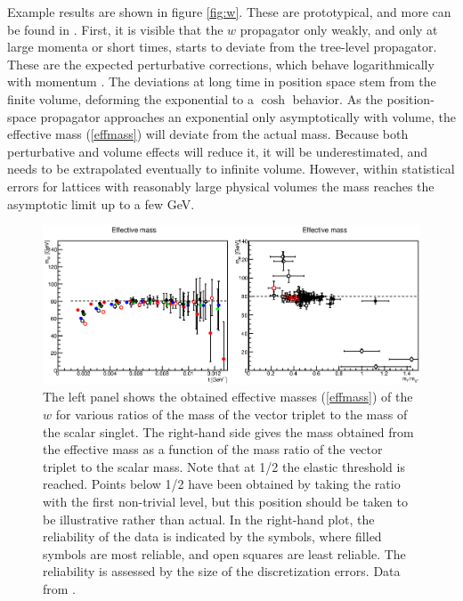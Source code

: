 \documentclass[final,12pt]{article}
\newcommand*{\pref}[1]{(\ref{#1})}
\newcommand*{\1}{1\!\!\!\bot}
\begin{document}
Example results are shown in figure \ref{fig:w}. These are prototypical, and more can be found in  \cite{Maas:2013aia,Maas:unpublished,Maas:2012tj,Maas:2010nc}. First, it is visible that the $w$ propagator only weakly, and only at large momenta or short times, starts to deviate from the tree-level propagator. These are the expected perturbative corrections, which behave logarithmically with momentum \cite{Bohm:2001yx}. The deviations at long time in position space stem from the finite volume, deforming the exponential to a $\cosh$ behavior. As the position-space propagator approaches an exponential only asymptotically with volume, the effective mass \pref{effmass} will deviate from the actual mass. Because both perturbative and volume effects will reduce it, it will be underestimated, and needs to be extrapolated eventually to infinite volume. However, within statistical errors for lattices with reasonably large physical volumes the mass reaches the asymptotic limit up to a few GeV.

\begin{figure}
\includegraphics[width=\linewidth]{w-mass}
\caption{\label{fig:wmass}The left panel shows the obtained effective masses \pref{effmass} of the $w$ for various ratios of the mass of the vector triplet to the mass of the scalar singlet. The right-hand side gives the mass obtained from the effective mass as a function of the mass ratio of the vector triplet to the scalar mass. Note that at 1/2 the elastic threshold is reached. Points below 1/2 have been obtained by taking the ratio with the first non-trivial level, but this position should be taken to be illustrative rather than actual. In the right-hand plot, the reliability of the data is indicated by the symbols, where filled symbols are most reliable, and open squares are least reliable. The reliability is assessed by the size of the discretization errors. Data from \cite{Maas:2013aia,Maas:unpublished}.}
\end{figure}
\end{document}
